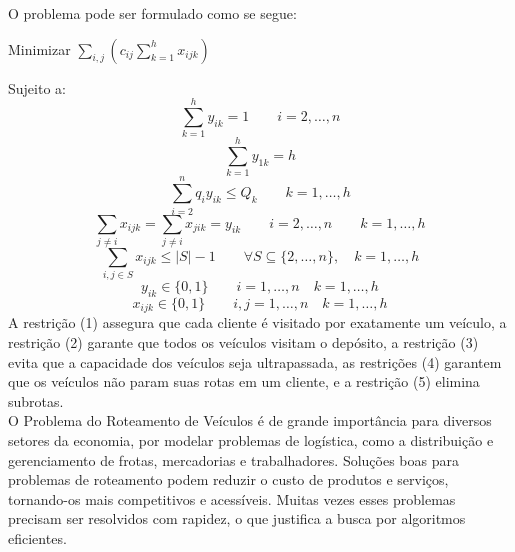\documentclass[12pt,a4paper]{article}
\newcommand{\blue}[1]{\textcolor{blue}{#1}}
\begin{document}
O problema pode ser formulado como se segue:
\begin{center}
Minimizar $\displaystyle\sum\limits_{i,j}\left(c_{ij}\sum\limits_{k=1}^{h}x_{ijk}\right)$
\end{center}
Sujeito a:
\begin{equation}
\sum\limits_{k=1}^{h}y_{ik}=1 \qquad i=2,\dots,n
\end{equation}
\begin{equation}
\sum\limits_{k=1}^{h}y_{1k}=h
\end{equation}
\begin{equation}
\sum\limits_{i=2}^{n}q_{i} y_{ik} \leqslant Q_{k} \qquad k=1,\dots,h
\end{equation}
\begin{equation}
\sum\limits_{j\neq i}x_{ijk} = \sum\limits_{j\neq i}x_{jik} = y_{ik} \qquad i=2,\dots,n \qquad k=1,\dots,h
\end{equation}
\begin{equation}
\sum\limits_{i,j \in S}x_{ijk} \leqslant |S|-1 \qquad \forall S\subseteq\lbrace2,\dots,n\rbrace ,\quad k=1,\dots,h
\end{equation}
\begin{equation}
y_{ik} \in \lbrace 0,1 \rbrace \qquad i=1,\dots,n \quad k=1,\dots,h
\end{equation}
\begin{equation}
x_{ijk} \in \lbrace 0,1 \rbrace \qquad i,j=1,\dots,n \quad k=1,\dots,h
\end{equation}
A restrição (1) assegura que cada cliente é visitado por exatamente um veículo, a restrição (2) garante que todos os veículos visitam o depósito, a restrição (3) evita que a capacidade dos veículos seja ultrapassada, as restrições (4) garantem que os veículos não param suas rotas em um cliente, e a restrição (5) elimina subrotas.\\

O Problema do Roteamento de Veículos é de grande importância para diversos setores da economia, por modelar problemas de logística, como a distribuição e gerenciamento de frotas, mercadorias e trabalhadores. Soluções boas para problemas de roteamento podem reduzir o custo de produtos e serviços, tornando-os mais competitivos e acessíveis. Muitas vezes esses problemas precisam ser resolvidos com rapidez, o que justifica a busca por algoritmos eficientes.
\end{document}
